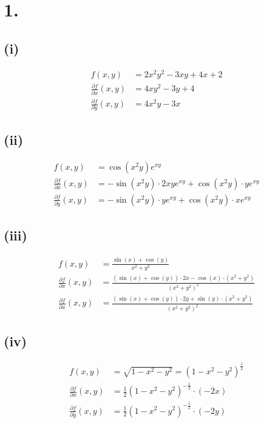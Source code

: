 \documentclass[a4paper]{scrartcl}
\title{\titleinfo}
\author{Elena Noll, Sven-Hendrik Haase, Arne Struck}
\date{\today}
\begin{document}
\maketitle
\notag


\section{1.}
\subsection{(i)}
\begin{align}
f(x,y) &= 2x^2y^2-3xy+4x+2 \\
\frac {\partial f} {\partial x}(x,y) &= 4xy^2 - 3y+4 \\
\frac {\partial f} {\partial y}(x,y) &= 4x^2y - 3x
\end{align}

\subsection{(ii)}
\begin{align}
f(x,y) &= \cos(x^2 y)e^{xy} \\
\frac {\partial f} {\partial x}(x,y) &= -\sin(x^2 y) \cdot 2xy e^{xy} + \cos(x^2 y) \cdot ye^{xy} \\
\frac {\partial f} {\partial y}(x,y) &= -\sin(x^2 y) \cdot ye^{xy} + \cos(x^2 y) \cdot xe^{xy}
\end{align}

\subsection{(iii)}
\begin{align}
f(x,y) &= \frac {\sin(x) + \cos(y)} {x^2+y^2} \\
\frac {\partial f} {\partial x}(x,y) &= \frac {(\sin(x) + \cos(y)) \cdot 2x - \cos(x) \cdot (x^2+y^2)} {(x^2+y^2)^2} \\
\frac {\partial f} {\partial x}(x,y) &= \frac {(\sin(x) + \cos(y)) \cdot 2y + \sin(y) \cdot (x^2+y^2)} {(x^2+y^2)^2}
\end{align}

\subsection{(iv)}
\begin{align}
f(x,y) &= \sqrt{1-x^2-y^2} = (1-x^2-y^2)^{\frac 1 2} \\
\frac {\partial f} {\partial x}(x,y) &= \frac 1 2 (1-x^2-y^2)^{- \frac 1 2} \cdot (-2x) \\
\frac {\partial f} {\partial y}(x,y) &= \frac 1 2 (1-x^2-y^2)^{- \frac 1 2} \cdot (-2y)
\end{align}
\end{document}
